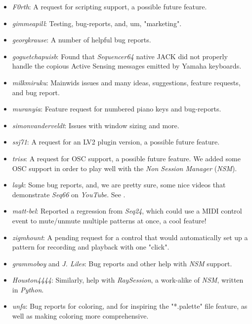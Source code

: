   \begin{itemize}
      \item \textsl{F0rth}:
         A request for scripting support, a possible future feature.
      \item \textsl{gimmeapill}:
         Testing, bug-reports, and, um, "marketing".
      \item \textsl{georgkrause}:
         A number of helpful bug reports.
      \item \textsl{goguetchapuisb}:
         Found that \textsl{Sequencer64} native JACK did not properly handle
         the copious Active Sensing messages emitted by Yamaha keyboards.
      \item \textsl{milkmiruku}:
         Mainwids issues and many ideas, suggestions, feature requests, and bug
         report.
      \item \textsl{muranyia}:
         Feature request for numbered piano keys and bug-reports.
      \item \textsl{simonvanderveldt}:
         Issues with window sizing and more.
      \item \textsl{ssj71}:
         A request for an LV2 plugin version, a possible future feature.
      \item \textsl{triss}:
         A request for OSC support, a possible future feature.  We added some
         OSC support in order to play well with the \textsl{Non Session
         Manager} (\textsl{NSM}).
      \item \textsl{layk}:
         Some bug reports, and, we are pretty sure, some nice videos that
         demonstrate \textsl{Seq66} on \textsl{YouTube}.  See
         \cite{layk}.
      \item \textsl{matt-bel}:
         Reported a regression from \textsl{Seq24}, which could use
         a MIDI control event to mute/unmute multiple patterns at once,
         a cool feature!
      \item \textsl{zigmhount}:
         A pending request for a control that would automatically set up a
         pattern for recording and playback with one "click".
      \item \textsl{grammoboy} and \textsl{J. Liles}:
         Bug reports and other help with \textsl{NSM} support.
      \item \textsl{Houston4444}:
         Similarly, help with \textsl{RaySession}, a work-alike of
         \textsl{NSM}, written in \textsl{Python}.
      \item \textsl{unfa}:
         Bug reports for coloring, and for inspiring the "*.palette" file
         feature, as well as making coloring more comprehensive.
   \end{itemize}

